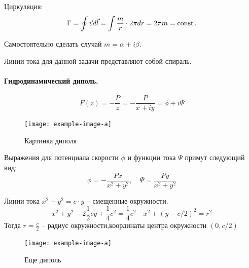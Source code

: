 Циркуляция:
\begin{equation}
	\Gamma=\oint \vec{v}d\vec{l}=\int \frac{m}{r}\cdot 2\pi dr=2\pi m = \mathrm{const}\,.
\end{equation}

Самостоятельно сделать случай $m=\alpha+i\beta$.

%
%
%

Линии тока для данной задачи представляют собой спираль.
\paragraph{Гидродинамический диполь.}
\begin{equation}
	F(z)=-\frac{P}{z}=-\frac{P}{x+iy}=\phi+i\Psi
\end{equation}

\begin{figure}[h!]
    \centering
    \texttt{[image: example-image-a]}
    \caption{Картинка диполя}
    \label{fig:figure1}
\end{figure}

Выражения для потенциала скорости $\phi$ и функции тока $\Psi$ примут следующий вид:
\begin{equation}
	\phi=-\frac{Px}{x^2+y^2}, \quad
	\Psi=\frac{Py}{x^2+y^2}
\end{equation}

Линии тока $x^2+y^2=c\cdot y$ -- смещенные окружности.
\begin{equation}
	x^2+y^2-2\frac{1}{2}cy+\frac{1}{4}c^2=\frac{1}{4}c^2 \quad
	x^2+(y-c/2)^2=r^2
\end{equation}
Тогда $r=\frac{c}{2}$ -- радиус окружности,координаты центра окружности $(0,c/2)$%
\begin{figure}[h!]
    \centering
    \texttt{[image: example-image-a]}
    \caption{Еще диполь}
    \label{fig:figure1}
\end{figure}


